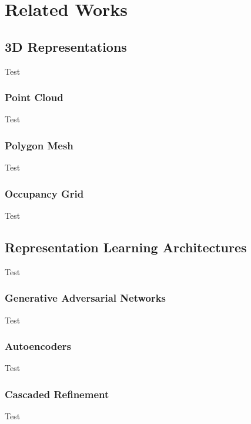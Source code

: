 
\chapter{Related Works}

\vspace{1em}

\section{3D Representations}

Test

\subsection{Point Cloud}

Test

\subsection{Polygon Mesh}

Test

\subsection{Occupancy Grid}

Test


\section{Representation Learning Architectures}

Test

\subsection{Generative Adversarial Networks}

Test

\subsection{Autoencoders}

Test

\subsection{Cascaded Refinement}

Test